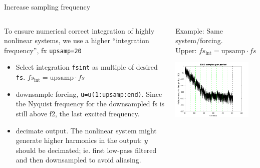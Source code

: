 \documentclass[9pt]{beamer}
\begin{document}
\begin{frame}{Increase sampling frequency}
  \begin{columns}
    \begin{column}{0.5\textwidth}
      To ensure numerical correct integration of highly nonlinear systems, we
      use a higher ``integration frequency'', fx \texttt{upsamp=20}
      \begin{itemize}
      \item Select integration \texttt{fsint} as multiple of desired \texttt{fs}.
        $fs_\text{int} =\text{upsamp} \cdot fs$
      \item downsample forcing, \texttt{u=u(1:upsamp:end)}. Since the Nyquist
        frequency for the downsampled fs is still above f2, the last excited
        frequency.
      \item decimate output. The nonlinear system might generate higher
        harmonics in the output: $y$ should be decimated; ie. first low-pass
        filtered and then downsampled to avoid aliasing.
      \end{itemize}
    \end{column}
    \begin{column}{0.5\textwidth}  %
      Example: Same system/forcing.\\ Upper: $fs_\text{int} =\text{upsamp}\cdot fs$
      \begin{center}
        \includegraphics[width=0.9\textwidth]{fig/b1_A30_ms_full1_periodicity}

\end{center}
\end{column}
\end{columns}
\end{frame}
\end{document}

